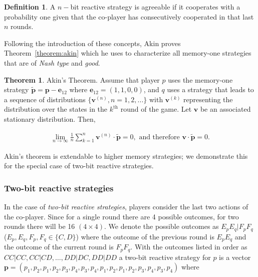 \documentclass{article}
\theoremstyle{definition}
\newtheorem{definition}{Definition}[section]
\newtheorem{theorem}{Theorem}[section]
\begin{document}
\begin{definition}\label{def:agreeable}
A \(n-\)bit reactive strategy is agreeable if it cooperates with a probability one
given that the co-player has consecutively cooperated in that last \(n\) rounds.
\end{definition}

Following the introduction of these concepts, Akin proves
Theorem~\ref{theorem:akin} which he uses to characterize all memory-one
strategies that are of \textit{Nash type} and \textit{good}.

\begin{theorem}{Akin's Theorem.}
  Assume that player \(p\) uses the memory-one strategy \(\mathbf{\tilde{p}} = \mathbf{p} - \mathbf{e}_{12}\) where
  \(\mathbf{e}_{12} = (1, 1, 0, 0)\), and \(q\) uses a strategy that leads to a sequence
  of distributions \(\{\mathbf{v}^{(n)}, n = 1, 2, ...\}\) with \(\mathbf{v}^{(k)}\) representing the
  distribution over the states in the \(k^{\text{th}}\) round of the game. Let
  \(\mathbf{v}\) be an associated stationary distribution. Then,

  \begin{align}
    \lim_{n \rightarrow \infty} \frac{1}{n} \sum_{k=1}^{n} \mathbf{v}^{(n)} \cdot \mathbf{\tilde{p}} = 0, \text{ and therefore } \mathbf{v} \cdot \mathbf{\tilde{p}} = 0.
  \end{align}
\end{theorem}\label{theorem:akin}

Akin's theorem is extendable to higher memory strategies; we demonstrate this for
the special case of two-bit reactive strategies.

\subsubsection{Two-bit reactive strategies}

In the case of \textit{two-bit reactive strategies}, players consider the last
two actions of the co-player.  Since for a single round there are 4 possible
outcomes, for two rounds there will be 16 \((4 \times 4)\). We denote the
possible outcomes as \(E_p E_q | F_p F_q\) (\(E_p, E_q, F_p, F_q \in \{C, D\}\))
where the outcome of the previous round is \(E_p E_q\) and the outcome of the
current round is \(F_p F_q\). With the outcomes listed in order as \(CC|CC,
CC|CD, \dots, DD|DC, DD|DD\) a two-bit reactive strategy for \(p\) is a vector
\(\mathbf{p} = (p_1, p_2, p_1, p_2, p_3, p_4, p_3, p_4, p_1, p_2, p_1, p_2, p_3,
p_4, \allowbreak p_3, p_4)\) where
\end{document}
